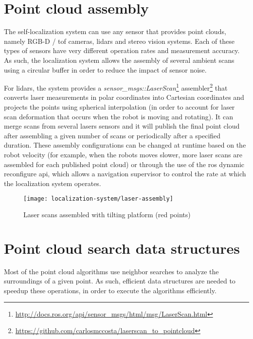 \section{Point cloud assembly}

The self-localization system can use any sensor that provides point clouds, namely RGB-D / \gls{tof} cameras, \glspl{lidar} and stereo vision systems. Each of these types of sensors have very different operation rates and measurement accuracy. As such, the localization system allows the assembly of several ambient scans using a circular buffer in order to reduce the impact of sensor noise.

For \glspl{lidar}, the system provides a \emph{sensor\_msgs::LaserScan}\footnote{\url{http://docs.ros.org/api/sensor_msgs/html/msg/LaserScan.html}} assembler\footnote{\url{https://github.com/carlosmccosta/laserscan_to_pointcloud}} that converts laser measurements in polar coordinates into Cartesian coordinates and projects the points using spherical interpolation (in order to account for laser scan deformation that occurs when the robot is moving and rotating). It can merge scans from several lasers sensors and it will publish the final point cloud after assembling a given number of scans or periodically after a specified duration. These assembly configurations can be changed at runtime based on the robot velocity (for example, when the robots moves slower, more laser scans are assembled for each published point cloud) or through the use of the \gls{ros} dynamic reconfigure \gls{api}, which allows a navigation supervisor to control the rate at which the localization system operates.


\begin{figure}[H]
	\centering
	\texttt{[image: localization-system/laser-assembly]}
	\caption{Laser scans assembled with tilting platform (red points)}
	\label{fig:localization-system_section_laser_assembly}
\end{figure}



\section{Point cloud search data structures}

Most of the point cloud algorithms use neighbor searches to analyze the surroundings of a given point. As such, efficient data structures are needed to speedup these operations, in order to execute the algorithms efficiently.


